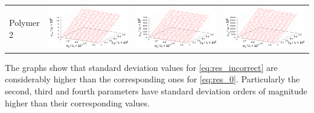 \documentclass[11pt,a4paper]{article}
\theoremstyle{definition}
\begin{document}
\begin{table}[h]
\begin{tabular}{l | c c c}
	\begin{rotate}{90}Polymer 2\end{rotate} &	\includegraphics[scale=0.4]{figs/all/p2.txt_coeff0.dat.eps} & \includegraphics[scale=0.4]{figs/all/p2.txt_coeff1.dat.eps} & \includegraphics[scale=0.4]{figs/all/p2.txt_coeff2.dat.eps}
  \end{tabular}
  \label{tabl:res_incorrect}
\end{table}

The graphs show that standard deviation values for \eqref{eq:res_incorrect} are considerably higher
than the corresponding ones for \eqref{eq:res_0}. Particularly the second, third and fourth
parameters have standard deviation orders of magnitude higher than their corresponding values.
\end{document}
